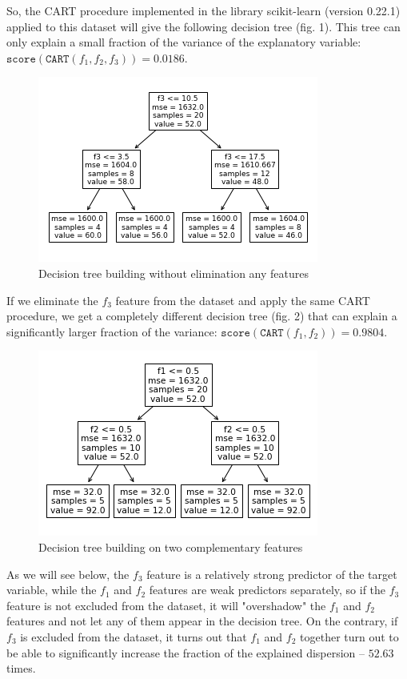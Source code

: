 \documentclass[conference]{IEEEtran}
\theoremstyle{definition}
\begin{document}
So, the CART procedure implemented in the library scikit-learn (version 0.22.1) applied to this dataset will give the following decision tree (fig. 1). This tree can only explain a small fraction of the variance of the explanatory variable: $\texttt{score}(\texttt{CART}(f_1, f_2, f_3)) = 0.0186$. 

\begin{figure}[htbp]
\centerline{\includegraphics[scale=0.77]{figure1.png}}
\caption{Decision tree building without elimination any features}
\label{fig1}
\end{figure}

If we eliminate the $f_3$ feature from the dataset and apply the same CART procedure, we get a completely different decision tree (fig. 2) that can explain a significantly larger fraction of the variance: $\texttt{score}(\texttt{CART}(f_1, f_2)) = 0.9804$. 


\begin{figure}[htbp]
\centerline{\includegraphics[scale=0.77]{figure2.png}}
\caption{Decision tree building on two complementary features}
\label{fig2}
\end{figure}


As we will see below, the $f_3$ feature is a relatively strong predictor of the target variable, while the $f_1$ and $f_2$ features are weak predictors separately, so if the $f_3$ feature is not excluded from the dataset, it will "overshadow" the $f_1$ and $f_2$ features and not let any of them appear in the decision tree. On the contrary, if $f_3$ is excluded from the dataset, it turns out that $f_1$ and $f_2$ together turn out to be able to significantly increase the fraction of the explained dispersion -- $52.63$ times.
\end{document}
